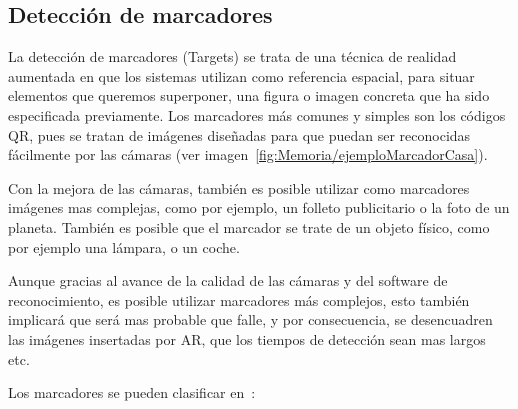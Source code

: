 \subsection{Detección de marcadores}

La detección de marcadores (Targets) se trata de una técnica de realidad aumentada en que los sistemas utilizan como referencia espacial, para situar elementos que queremos superponer, una figura o imagen concreta que ha sido especificada previamente. Los marcadores más comunes y simples son los códigos QR, pues se tratan de imágenes diseñadas para que puedan ser reconocidas fácilmente por las cámaras (ver imagen~\ref{fig:Memoria/ejemploMarcadorCasa}).


Con la mejora de las cámaras, también es posible utilizar como marcadores imágenes mas complejas, como por ejemplo, un folleto publicitario o la foto de un planeta.
También es posible que el marcador se trate de un objeto físico, como por ejemplo una lámpara, o un coche.


Aunque gracias al avance de la calidad de las cámaras y del software de reconocimiento, es posible utilizar marcadores más complejos, esto también implicará que será mas probable que falle, y por consecuencia, se desencuadren las imágenes insertadas por AR, que los tiempos de detección sean mas largos etc.

Los marcadores se pueden clasificar en~\cite{linowes_babilinski_2017}:



